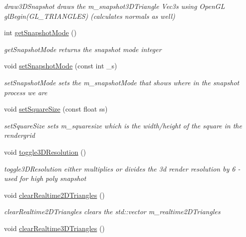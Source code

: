 \begin{DoxyCompactItemize}
\begin{DoxyCompactList}\small\item\em draw3\-D\-Snapshot draws the m\-\_\-snapshot3\-D\-Triangle Vec3s using Open\-G\-L gl\-Begin(\-G\-L\-\_\-\-T\-R\-I\-A\-N\-G\-L\-E\-S) (calculates normals as well) \end{DoxyCompactList}\item 
int \hyperlink{classMarchingAlgorithms_a36c86931558ec0de770baf06f6a8e2a5}{get\-Snapshot\-Mode} ()
\begin{DoxyCompactList}\small\item\em get\-Snapshot\-Mode returns the snapshot mode integer \end{DoxyCompactList}\item 
void \hyperlink{classMarchingAlgorithms_a9fafe791d5a20410bce4200709fa666a}{set\-Snapshot\-Mode} (const int \-\_\-s)
\begin{DoxyCompactList}\small\item\em set\-Snapshot\-Mode sets the m\-\_\-snapshot\-Mode that shows where in the snapshot process we are \end{DoxyCompactList}\item 
void \hyperlink{classMarchingAlgorithms_a4b80a9c0f5d814ed1d931655b3472c38}{set\-Square\-Size} (const float ss)
\begin{DoxyCompactList}\small\item\em set\-Square\-Size sets m\-\_\-squaresize which is the width/height of the square in the rendergrid \end{DoxyCompactList}\item 
\hypertarget{classMarchingAlgorithms_a2c340f6b3e3fc8ce8c06d7df8dfc3d1c}{void \hyperlink{classMarchingAlgorithms_a2c340f6b3e3fc8ce8c06d7df8dfc3d1c}{toggle3\-D\-Resolution} ()}\label{classMarchingAlgorithms_a2c340f6b3e3fc8ce8c06d7df8dfc3d1c}

\begin{DoxyCompactList}\small\item\em toggle3\-D\-Resolution either multiplies or divides the 3d render resolution by 6 -\/ used for high poly snapshot \end{DoxyCompactList}\item 
\hypertarget{classMarchingAlgorithms_a55306a1801044ba00de5211f2408ad92}{void \hyperlink{classMarchingAlgorithms_a55306a1801044ba00de5211f2408ad92}{clear\-Realtime2\-D\-Triangles} ()}\label{classMarchingAlgorithms_a55306a1801044ba00de5211f2408ad92}

\begin{DoxyCompactList}\small\item\em clear\-Realtime2\-D\-Triangles clears the std\-::vector m\-\_\-realtime2\-D\-Triangles \end{DoxyCompactList}\item 
\hypertarget{classMarchingAlgorithms_a15e0be9c959ad5b35cc92f91546af3d2}{void \hyperlink{classMarchingAlgorithms_a15e0be9c959ad5b35cc92f91546af3d2}{clear\-Realtime3\-D\-Triangles} ()}\label{classMarchingAlgorithms_a15e0be9c959ad5b35cc92f91546af3d2}


\end{DoxyCompactItemize}

